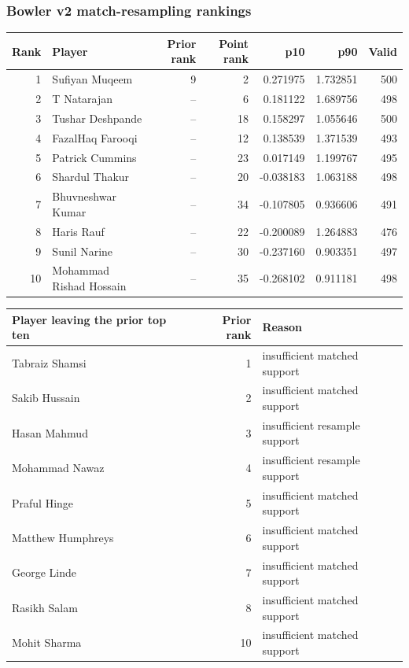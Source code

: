 \clearpage

\subsubsection*{Bowler v2 match-resampling rankings}

\begin{center}
\begin{tabularx}{\linewidth}{r>{\raggedright\arraybackslash}Xrrrrr}
\toprule
Rank & Player & Prior rank & Point rank & p10 & p90 & Valid \\
\midrule
1 & Sufiyan Muqeem & 9 & 2 & 0.271975 & 1.732851 & 500 \\
2 & T Natarajan & -- & 6 & 0.181122 & 1.689756 & 498 \\
3 & Tushar Deshpande & -- & 18 & 0.158297 & 1.055646 & 500 \\
4 & FazalHaq Farooqi & -- & 12 & 0.138539 & 1.371539 & 493 \\
5 & Patrick Cummins & -- & 23 & 0.017149 & 1.199767 & 495 \\
6 & Shardul Thakur & -- & 20 & -0.038183 & 1.063188 & 498 \\
7 & Bhuvneshwar Kumar & -- & 34 & -0.107805 & 0.936606 & 491 \\
8 & Haris Rauf & -- & 22 & -0.200089 & 1.264883 & 476 \\
9 & Sunil Narine & -- & 30 & -0.237160 & 0.903351 & 497 \\
10 & Mohammad Rishad Hossain & -- & 35 & -0.268102 & 0.911181 & 498 \\
\bottomrule
\end{tabularx}
\end{center}

\begin{center}
\begin{tabularx}{\linewidth}{>{\raggedright\arraybackslash}Xr>{\raggedright\arraybackslash}X}
\toprule
Player leaving the prior top ten & Prior rank & Reason \\
\midrule
Tabraiz Shamsi & 1 & insufficient matched support \\
Sakib Hussain & 2 & insufficient matched support \\
Hasan Mahmud & 3 & insufficient resample support \\
Mohammad Nawaz & 4 & insufficient resample support \\
Praful Hinge & 5 & insufficient matched support \\
Matthew Humphreys & 6 & insufficient matched support \\
George Linde & 7 & insufficient matched support \\
Rasikh Salam & 8 & insufficient matched support \\
Mohit Sharma & 10 & insufficient matched support \\
\bottomrule
\end{tabularx}
\end{center}

